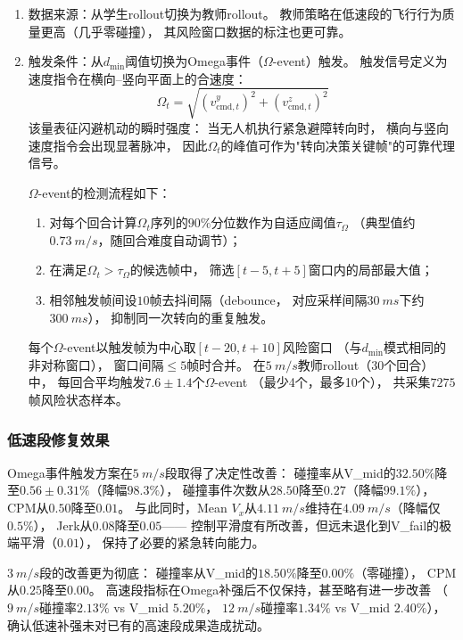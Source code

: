 \begin{enumerate}
  \item 数据来源：从学生rollout切换为教师rollout。
    教师策略在低速段的飞行行为质量更高（几乎零碰撞），
    其风险窗口数据的标注也更可靠。

  \item 触发条件：从$d_{\min}$阈值切换为Omega事件（$\Omega$-event）触发。
    触发信号定义为速度指令在横向--竖向平面上的合速度：
    \begin{equation}
      \Omega_t = \sqrt{(v^y_{\text{cmd},t})^2 + (v^z_{\text{cmd},t})^2}
    \label{eq:omega_signal}
    \end{equation}
    该量表征闪避机动的瞬时强度：
    当无人机执行紧急避障转向时，
    横向与竖向速度指令会出现显著脉冲，
    因此$\Omega_t$的峰值可作为"转向决策关键帧"的可靠代理信号。

    $\Omega$-event的检测流程如下：
    \begin{enumerate}
      \item 对每个回合计算$\Omega_t$序列的$90\%$分位数作为自适应阈值$\tau_\Omega$
        （典型值约$\SI{0.73}{m/s}$，随回合难度自动调节）；
      \item 在满足$\Omega_t > \tau_\Omega$的候选帧中，
        筛选$[t-5, t+5]$窗口内的局部最大值；
      \item 相邻触发帧间设$10$帧去抖间隔（debounce，
        对应采样间隔$\SI{30}{ms}$下约$\SI{300}{ms}$），
        抑制同一次转向的重复触发。
    \end{enumerate}
    每个$\Omega$-event以触发帧为中心取$[t-20, t+10]$风险窗口
    （与$d_{\min}$模式相同的非对称窗口），
    窗口间隔$\leq 5$帧时合并。
    在$\SI{5}{m/s}$教师rollout（30个回合）中，
    每回合平均触发$7.6 \pm 1.4$个$\Omega$-event
    （最少4个，最多10个），
    共采集$7275$帧风险状态样本。
\end{enumerate}

\subsubsection{低速段修复效果}

Omega事件触发方案在$\SI{5}{m/s}$段取得了决定性改善：
碰撞率从V\_mid的$32.50\%$降至$0.56 \pm 0.31\%$（降幅$98.3\%$），
碰撞事件次数从$28.50$降至$0.27$（降幅$99.1\%$），
CPM从$0.50$降至$0.01$。
与此同时，Mean $V_x$从$\SI{4.11}{m/s}$维持在$\SI{4.09}{m/s}$（降幅仅$0.5\%$），
Jerk从$0.08$降至$0.05$——
控制平滑度有所改善，但远未退化到V\_fail的极端平滑（$0.01$），
保持了必要的紧急转向能力。

$\SI{3}{m/s}$段的改善更为彻底：
碰撞率从V\_mid的$18.50\%$降至$0.00\%$（零碰撞），
CPM从$0.25$降至$0.00$。
高速段指标在Omega补强后不仅保持，甚至略有进一步改善
（$\SI{9}{m/s}$碰撞率$2.13\%$ vs V\_mid $5.20\%$，
$\SI{12}{m/s}$碰撞率$1.34\%$ vs V\_mid $2.40\%$），
确认低速补强未对已有的高速段成果造成扰动。

